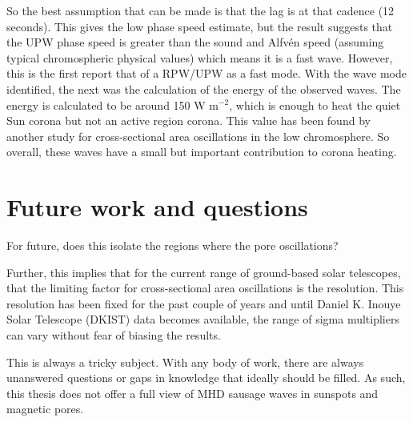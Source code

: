     So the best assumption that can be made is that the lag is at that cadence (12 seconds). 
    This gives the low phase speed estimate, but the result suggests that the UPW phase speed is greater than the sound and Alfv\'en speed (assuming typical chromospheric physical values) which means it is a fast wave. 
    However, this is the first report that of a RPW/UPW as a fast mode.
    With the wave mode identified, the next was the calculation of the energy of the observed waves.
    The energy is calculated to be around 150 W m$^{-2}$, which is enough to heat the quiet Sun corona but not an active region corona.
    This value has been found by another study for cross-sectional area oscillations in the low chromosphere.
    So overall, these waves have a small but important contribution to corona heating.
    
\section{Future work and questions}
    
    
        For future, does this isolate the regions where the pore oscillations? 
        
      
      Further, this implies that for the current range of ground-based solar telescopes, that the limiting factor for cross-sectional area oscillations is the resolution.
      This resolution has been fixed for the past couple of years and until Daniel K. Inouye Solar Telescope (DKIST) data becomes available, the range of sigma multipliers can vary without fear of biasing the results. 
             
    This is always a tricky subject.
    With any body of work, there are always unanswered questions or gaps in knowledge that ideally should be filled.
    As such, this thesis does not offer a full view of MHD sausage waves in sunspots and magnetic pores.
    
